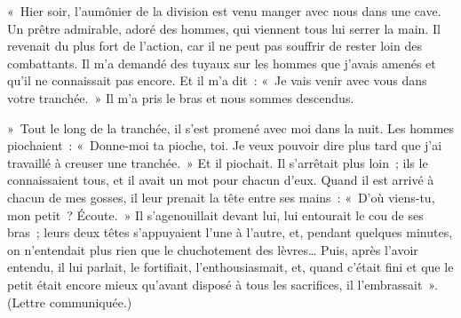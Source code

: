 \documentclass[french,twoside]{book} %
\newenvironment{quoteblock}%
  {\begin{quoting}}
  {\end{quoting}}
\newenvironment{quotebar}{%
    \def\FrameCommand{{\color{rubric!10!}\vrule width 0.5em} \hspace{0.9em}}%
    \def\OuterFrameSep{\itemsep} %
    \MakeFramed {\advance\hsize-\width \FrameRestore}
  }%
  {%
    \endMakeFramed
  }
\renewenvironment{quoteblock}%
  {%
    \savenotes
    \setstretch{0.9}
    \normalfont
    \begin{quotebar}
  }
  {%
    \end{quotebar}
    \spewnotes
  }
\begin{document}
\begin{quoteblock}
\noindent « Hier soir, l’aumônier de la division est venu manger avec nous dans une cave. Un prêtre admirable, adoré des hommes, qui viennent tous lui serrer la main. Il revenait du plus fort de l’action, car il ne peut pas souffrir de rester loin des combattants. Il m’a demandé des tuyaux sur les hommes que j’avais amenés et qu’il ne connaissait pas encore. Et il m’a dit : « Je vais venir avec vous dans votre tranchée. » Il m’a pris le bras et nous sommes descendus.‌\par
 » Tout le long de la tranchée, il s’est promené avec moi dans la nuit. Les hommes piochaient : « Donne-moi ta pioche, toi. Je veux pouvoir dire plus tard que j’ai travaillé à creuser une tranchée. » Et il piochait. Il s’arrêtait plus loin ; ils le connaissaient tous, et il avait un mot pour chacun d’eux. Quand il est arrivé à chacun de mes gosses, il leur prenait la tête entre ses mains : « D’où viens-tu, mon petit ? Écoute. » Il s’agenouillait devant lui, lui entourait le cou de ses bras ; leurs deux têtes s’appuyaient l’une à l’autre, et, pendant quelques minutes, on n’entendait plus rien que le chuchotement des lèvres… Puis, après l’avoir entendu, il lui parlait, le fortifiait, l’enthousiasmait, et, quand c’était fini et que le petit était encore mieux qu’avant disposé à tous les sacrifices, il l’embrassait ». (Lettre communiquée.)
\end{quoteblock}
\end{document}
